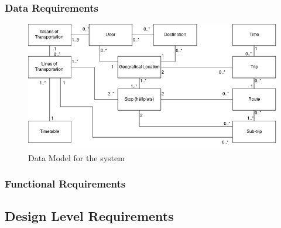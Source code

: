 \documentclass[a4paper]{article}
\begin{document}
			\subsubsection{Data Requirements}
			
			
			
				\begin{figure}[h]
					\includegraphics[scale=0.50]{img/datamodel-v2.png}
					\caption{Data Model for the system}
				\end{figure}
			
			
			\pagebreak
			\subsubsection{Functional Requirements}
				
		
					
				
		\subsection{Design Level Requirements}
		
\end{document}
